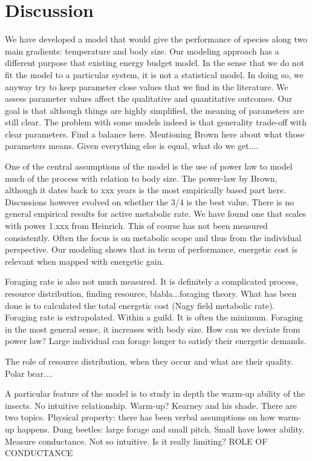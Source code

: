\section*{Discussion}
We have developed a model that would give the performance of species along two main gradients: temperature and  body size.
Our modeling approach has a different purpose that existing energy budget model.
In the sense that we do not fit the model to a particular system, it is not a statistical model.
In doing so, we anyway try to keep parameter close values that we find in the literature.
We assess parameter values affect the qualitative and quantitative outcomes.
Our goal is that although things are highly simplified, the meaning of parameters are still clear.
The problem with some models indeed is that generality trade-off with clear parameters.
Find a balance here.
Mentioning Brown here about what those parameters means. 
Given everything else is equal, what do we get....

One of the central assumptions of the model is the use of power law to model much of the process with relation to body size.
The power-law by Brown, although it dates back to xxx years is the most empirically based part here.
Discussions however evolved on whether the 3/4 is the best value.
There is no general empirical results for active metabolic rate. 
We have found one that scales with power 1.xxx from Heinrich. 
This of course has not been measured consistently. 
Often the focus is on metabolic scope and thus from the individual perspective.
Our modeling shows that in term of performance, energetic cost is relevant when mapped with energetic gain.

Foraging rate is also not much measured.
It is definitely a complicated process, resource distribution, finding resource, blabla...foraging theory.
What has been done is to calculated the total energetic cost (Nagy field metabolic rate).
Foraging rate is extrapolated.
Within a guild.
It is often the minimum.
Foraging in the most general sense, it increases with body size.
How can we deviate from power law? Large individual can forage longer to satisfy their energetic demands.

The role of resource distribution, when they occur and what are their quality.
Polar bear....

A particular feature of the model is to study in depth the warm-up ability of the insects.
No intuitive relationship.
Warm-up? Kearney and his shade.
There are two topics.
Physical property:
there has  been verbal assumptions on how warm-up happens.
Dung beetles: large forage and small pitch. 
Small have lower ability.
Measure conductance.
Not so intuitive.
Is it really limiting?
ROLE OF CONDUCTANCE

